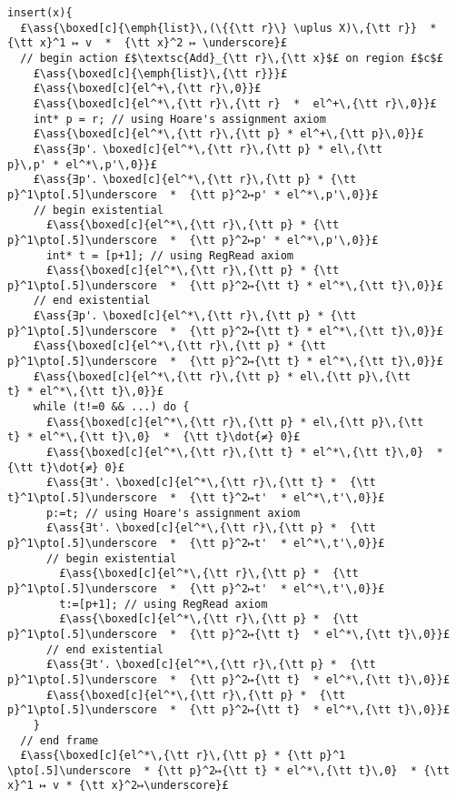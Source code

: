 \documentclass[12pt,a4paper]{article}
\makeatletter
\newcommand{\ml}[2][t]{\mbox{\mdseries\begin{tabular}[#1]{@{}L@{}}#2\end{tabular}}}
\newcommand{\ass}[1]{\ensuremath{{\color{blue}\left\{\ml[c]{#1}\right\}}}}
\makeatother
\begin{document}
\begin{lstlisting}
insert(x){
  £\ass{\boxed[c]{\emph{list}\,(\{{\tt r}\} \uplus X)\,{\tt r}}  *  {\tt x}^1 ↦ v  *  {\tt x}^2 ↦ \underscore}£
  // begin action £$\textsc{Add}_{\tt r}\,{\tt x}$£ on region £$c$£
    £\ass{\boxed[c]{\emph{list}\,{\tt r}}}£
    £\ass{\boxed[c]{el^+\,{\tt r}\,0}}£
    £\ass{\boxed[c]{el^*\,{\tt r}\,{\tt r}  *  el^+\,{\tt r}\,0}}£
    int* p = r; // using Hoare's assignment axiom
    £\ass{\boxed[c]{el^*\,{\tt r}\,{\tt p} * el^+\,{\tt p}\,0}}£
    £\ass{∃p'．\boxed[c]{el^*\,{\tt r}\,{\tt p} * el\,{\tt p}\,p' * el^*\,p'\,0}}£
    £\ass{∃p'．\boxed[c]{el^*\,{\tt r}\,{\tt p} * {\tt p}^1\pto[.5]\underscore  *  {\tt p}^2↦p' * el^*\,p'\,0}}£
    // begin existential
      £\ass{\boxed[c]{el^*\,{\tt r}\,{\tt p} * {\tt p}^1\pto[.5]\underscore  *  {\tt p}^2↦p' * el^*\,p'\,0}}£
      int* t = [p+1]; // using RegRead axiom
      £\ass{\boxed[c]{el^*\,{\tt r}\,{\tt p} * {\tt p}^1\pto[.5]\underscore  *  {\tt p}^2↦{\tt t} * el^*\,{\tt t}\,0}}£
    // end existential
    £\ass{∃p'．\boxed[c]{el^*\,{\tt r}\,{\tt p} * {\tt p}^1\pto[.5]\underscore  *  {\tt p}^2↦{\tt t} * el^*\,{\tt t}\,0}}£
    £\ass{\boxed[c]{el^*\,{\tt r}\,{\tt p} * {\tt p}^1\pto[.5]\underscore  *  {\tt p}^2↦{\tt t} * el^*\,{\tt t}\,0}}£
    £\ass{\boxed[c]{el^*\,{\tt r}\,{\tt p} * el\,{\tt p}\,{\tt t} * el^*\,{\tt t}\,0}}£
    while (t!=0 && ...) do {
      £\ass{\boxed[c]{el^*\,{\tt r}\,{\tt p} * el\,{\tt p}\,{\tt t} * el^*\,{\tt t}\,0}  *  {\tt t}\dot{≠} 0}£
      £\ass{\boxed[c]{el^*\,{\tt r}\,{\tt t} * el^*\,{\tt t}\,0}  *  {\tt t}\dot{≠} 0}£
      £\ass{∃t'．\boxed[c]{el^*\,{\tt r}\,{\tt t} *  {\tt t}^1\pto[.5]\underscore  *  {\tt t}^2↦t'  * el^*\,t'\,0}}£
      p:=t; // using Hoare's assignment axiom
      £\ass{∃t'．\boxed[c]{el^*\,{\tt r}\,{\tt p} *  {\tt p}^1\pto[.5]\underscore  *  {\tt p}^2↦t'  * el^*\,t'\,0}}£
      // begin existential
        £\ass{\boxed[c]{el^*\,{\tt r}\,{\tt p} *  {\tt p}^1\pto[.5]\underscore  *  {\tt p}^2↦t'  * el^*\,t'\,0}}£
        t:=[p+1]; // using RegRead axiom
        £\ass{\boxed[c]{el^*\,{\tt r}\,{\tt p} *  {\tt p}^1\pto[.5]\underscore  *  {\tt p}^2↦{\tt t}  * el^*\,{\tt t}\,0}}£
      // end existential
      £\ass{∃t'．\boxed[c]{el^*\,{\tt r}\,{\tt p} *  {\tt p}^1\pto[.5]\underscore  *  {\tt p}^2↦{\tt t}  * el^*\,{\tt t}\,0}}£
      £\ass{\boxed[c]{el^*\,{\tt r}\,{\tt p} *  {\tt p}^1\pto[.5]\underscore  *  {\tt p}^2↦{\tt t}  * el^*\,{\tt t}\,0}}£
    }
  // end frame
  £\ass{\boxed[c]{el^*\,{\tt r}\,{\tt p} * {\tt p}^1 \pto[.5]\underscore  * {\tt p}^2↦{\tt t} * el^*\,{\tt t}\,0}  * {\tt x}^1 ↦ v * {\tt x}^2↦\underscore}£

\end{lstlisting}
\end{document}
